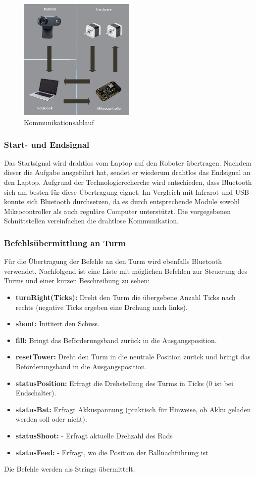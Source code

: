 \begin{figure}[h!]          
	\centering             
	\includegraphics[width=0.5\textwidth]{fig/kommunikationsablauf.jpg}    
	\caption{Kommunikationsablauf}
	
	\label{fig:Kommunikationsablauf}
\end{figure}
\noindent
\subsubsection{Start- und Endsignal}
Das Startsignal wird drahtlos vom Laptop auf den Roboter übertragen. Nachdem 
dieser die Aufgabe ausgeführt hat, sendet er wiederum drahtlos das Endsignal 
an den Laptop. Aufgrund der Technologierecherche wird entschieden, dass 
Bluetooth sich am besten für diese Übertragung eignet. Im Vergleich mit Infrarot und USB konnte sich Bluetooth durchsetzen, da es durch entsprechende Module sowohl Mikrocontroller als 
auch reguläre Computer unterstützt. Die vorgegebenen Schnittstellen vereinfachen die drahtlose Kommunikation.
\subsubsection{Befehlsübermittlung an Turm}
Für die Übertragung der Befehle an den Turm wird ebenfalls Bluetooth verwendet. Nachfolgend ist eine Liste mit möglichen Befehlen zur Steuerung des Turms und einer kurzen Beschreibung zu sehen:
\begin{itemize}
		\item \textbf{turnRight(Ticks):} Dreht den Turm die übergebene Anzahl Ticks nach rechts (negative Ticks ergeben eine Drehung nach links).
		\item \textbf{shoot:} Initiiert den Schuss.
		\item \textbf{fill:} Bringt das Beförderungsband zurück in die Ausgangsposition.
		\item \textbf{resetTower:} Dreht den Turm in die neutrale Position zurück und bringt das Beförderungsband in die Ausgangsposition.
		\item \textbf{statusPosition:} Erfragt die Drehstellung des Turms in Ticks (0 ist bei Endschalter).
		\item \textbf{statusBat:} Erfragt Akkuspannung (praktisch für Hinweise, ob Akku geladen werden soll oder nicht).
		\item \textbf{statusShoot:} - Erfragt aktuelle Drehzahl des Rads
		\item \textbf{statusFeed:} - Erfragt, wo die Position der Ballnachführung ist
	\end{itemize}
Die Befehle werden als Strings übermittelt.
